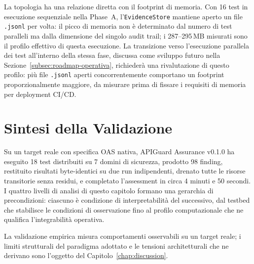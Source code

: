 La topologia ha una relazione diretta con il footprint di memoria. Con 16 test in esecuzione sequenziale nella Phase~A, l'\texttt{EvidenceStore} mantiene aperto un file \texttt{.jsonl} per volta: il picco di memoria non è determinato dal numero di test paralleli ma dalla dimensione del singolo audit trail; i 287--295\,MB misurati sono il profilo effettivo di questa esecuzione. La transizione verso l'esecuzione parallela dei test all'interno della stessa fase, discussa come sviluppo futuro nella Sezione~\ref{subsec:roadmap-operativa}, richiederà una rivalutazione di questo profilo: più file \texttt{.jsonl} aperti concorrentemente comportano un footprint proporzionalmente maggiore, da misurare prima di fissare i requisiti di memoria per deployment \gls{CI/CD}.









\section*{Sintesi della Validazione}

Su un target reale con specifica \gls{OAS} nativa, APIGuard Assurance v0.1.0 ha eseguito 18 test distribuiti su 7 domini di sicurezza, prodotto 98 finding, restituito risultati byte-identici su due run indipendenti, drenato tutte le risorse transitorie senza residui, e completato l'assessment in circa 4 minuti e 50 secondi. I quattro livelli di analisi di questo capitolo formano una gerarchia di precondizioni: ciascuno è condizione di interpretabilità del successivo, dal testbed che stabilisce le condizioni di osservazione fino al profilo computazionale che ne qualifica l'integrabilità operativa.

La validazione empirica misura comportamenti osservabili su un target reale; i limiti strutturali del paradigma adottato e le tensioni architetturali che ne derivano sono l'oggetto del Capitolo~\ref{chap:discussion}.

